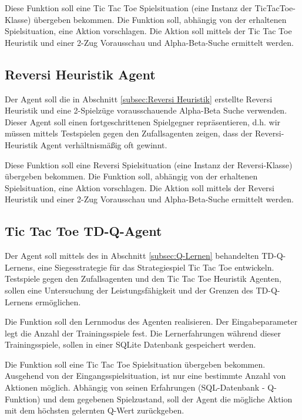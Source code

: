 Diese Funktion soll eine Tic Tac Toe Spielsituation (eine Instanz der TicTacToe-Klasse) übergeben bekommen. Die Funktion soll, abhängig von der erhaltenen Spielsituation, eine Aktion vorschlagen. Die Aktion soll mittels der Tic Tac Toe Heuristik und einer 2-Zug Vorausschau und Alpha-Beta-Suche ermittelt werden.

\subsection{Reversi Heuristik Agent}
Der Agent soll die in Abschnitt \ref{subsec:Reversi Heuristik} erstellte Reversi Heuristik und eine 2-Spielzüge vorausschauende Alpha-Beta Suche verwenden. Dieser Agent soll einen fortgeschrittenen Spielgegner repräsentieren, d.h. wir müssen mittels Testspielen gegen den Zufallsagenten zeigen, dass der Reversi-Heuristik Agent verhältnismäßig oft gewinnt.

Diese Funktion soll eine Reversi Spielsituation (eine Instanz der Reversi-Klasse) übergeben bekommen. Die Funktion soll, abhängig von der erhaltenen Spielsituation, eine Aktion vorschlagen. Die Aktion soll mittels der Reversi Heuristik und einer 2-Zug Vorausschau und Alpha-Beta-Suche ermittelt werden.

\subsection{Tic Tac Toe TD-Q-Agent}
Der Agent soll mittels des in Abschnitt \ref{subsec:Q-Lernen} behandelten TD-Q-Lernens, eine Siegesstrategie für das Strategiespiel Tic Tac Toe entwickeln. Testspiele gegen den Zufallsagenten und den Tic Tac Toe Heuristik Agenten, sollen eine Untersuchung der Leistungsfähigkeit und der Grenzen des TD-Q-Lernens ermöglichen.

Die Funktion soll den Lernmodus des Agenten realisieren. Der Eingabeparameter legt die Anzahl der Trainingsspiele fest. Die Lernerfahrungen während dieser Trainingsspiele, sollen in einer SQLite Datenbank gespeichert werden.

Die Funktion soll eine Tic Tac Toe Spielsituation übergeben bekommen. Ausgehend von der Eingangsspielsituation, ist nur eine bestimmte Anzahl von Aktionen möglich. Abhängig von seinen Erfahrungen (SQL-Datenbank - Q-Funktion) und dem gegebenen Spielzustand, soll der Agent die mögliche Aktion mit dem höchsten gelernten Q-Wert zurückgeben.

